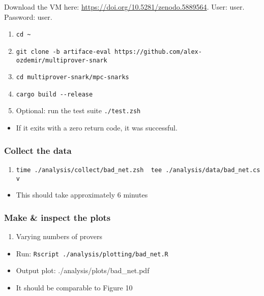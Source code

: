 \documentclass[letterpaper,twocolumn,10pt]{article}
\providecommand{\tightlist}{%
  \setlength{\itemsep}{0pt}\setlength{\parskip}{0pt}}
\begin{document}
{Download the VM here: \url{https://doi.org/10.5281/zenodo.5889564}. User: user.
Password: user.

\begin{enumerate}
\def\labelenumi{\arabic{enumi}.}
\tightlist
\item
  \texttt{cd\ \textasciitilde{}}
\item
  \texttt{git\ clone\ -b\ artiface-eval\ https://github.com/alex-ozdemir/multiprover-snark}
\item
  \texttt{cd\ multiprover-snark/mpc-snarks}
\item
  \texttt{cargo\ build\ -\/-release}
\item
  Optional: run the test suite \texttt{./test.zsh}
\end{enumerate}

\begin{itemize}
\tightlist
\item
  If it exits with a zero return code, it was successful.
\end{itemize}

\hypertarget{collect-the-data-1}{%
\subsubsection{Collect the data}\label{collect-the-data-1}}

\begin{enumerate}
\def\labelenumi{\arabic{enumi}.}
\tightlist
\item
  \texttt{time\ ./analysis/collect/bad\_net.zsh\ \textbar{}\ tee\ ./analysis/data/bad\_net.csv}
\end{enumerate}

\begin{itemize}
\tightlist
\item
  This should take approximately 6 minutes
\end{itemize}

\hypertarget{make-inspect-the-plots-1}{%
\subsubsection{Make \& inspect the plots}\label{make-inspect-the-plots-1}}

\begin{enumerate}
\def\labelenumi{\arabic{enumi}.}
\tightlist
\item
  Varying numbers of provers
\end{enumerate}

\begin{itemize}
\tightlist
\item
  Run: \texttt{Rscript\ ./analysis/plotting/bad\_net.R}
\item
  Output plot: ./analysis/plots/bad\_net.pdf
\item
  It should be comparable to Figure 10
\end{itemize}

}
\end{document}

